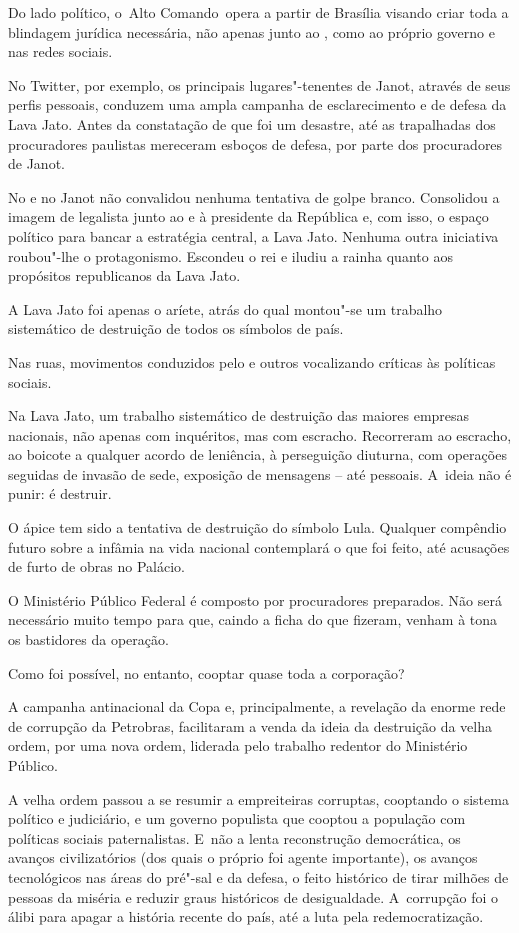 Do lado político, o~Alto Comando~opera a partir de Brasília visando
criar toda a blindagem jurídica necessária, não apenas junto ao ,
como ao próprio governo e nas redes sociais.

No Twitter, por exemplo, os principais lugares"-tenentes de Janot,
através de seus perfis pessoais, conduzem uma ampla campanha de
esclarecimento e de defesa da Lava Jato. Antes da constatação de que foi
um desastre, até as trapalhadas dos procuradores paulistas mereceram
esboços de defesa, por parte dos procuradores de Janot.

No  e no  Janot não convalidou nenhuma tentativa de golpe branco.
 Consolidou a imagem de legalista junto ao  e à presidente da
República e, com isso, o espaço político para bancar a estratégia
central, a Lava Jato. Nenhuma outra iniciativa roubou"-lhe o
protagonismo. Escondeu o rei e iludiu a rainha quanto aos propósitos
republicanos da Lava Jato.~

A Lava Jato foi apenas o aríete, atrás do qual montou"-se um trabalho
sistemático de destruição de todos os símbolos de país.

Nas ruas, movimentos conduzidos pelo  e outros vocalizando críticas
às políticas sociais.

Na Lava Jato, um trabalho sistemático de destruição das maiores empresas
nacionais, não apenas com inquéritos, mas com escracho. Recorreram ao
escracho, ao boicote a qualquer acordo de leniência, à perseguição
diuturna, com operações seguidas de invasão de sede, exposição de
mensagens -- até pessoais. A~ideia não é punir: é destruir.

O ápice tem sido a tentativa de destruição do símbolo Lula. Qualquer
compêndio futuro sobre a infâmia na vida nacional contemplará o que foi
feito, até acusações de furto de obras no Palácio.

O Ministério Público Federal é composto por procuradores preparados. Não
será necessário muito tempo para que, caindo a ficha do que fizeram,
venham à tona os bastidores da operação.

Como foi possível, no entanto, cooptar quase toda a corporação?

A campanha antinacional da Copa e, principalmente, a revelação da enorme
rede de corrupção da Petrobras, facilitaram a venda da ideia da
destruição da velha ordem, por uma nova ordem, liderada pelo trabalho
redentor do Ministério Público.

A velha ordem passou a se resumir a empreiteiras corruptas, cooptando o
sistema político e judiciário, e um governo populista que cooptou a
população com políticas sociais paternalistas. E~não a lenta
reconstrução democrática, os avanços civilizatórios (dos quais o próprio
 foi agente importante), os avanços tecnológicos nas áreas do pré"-sal
e da defesa, o feito histórico de tirar milhões de pessoas da miséria e
reduzir graus históricos de desigualdade. A~corrupção foi o álibi para
apagar a história recente do país, até a luta pela redemocratização.

